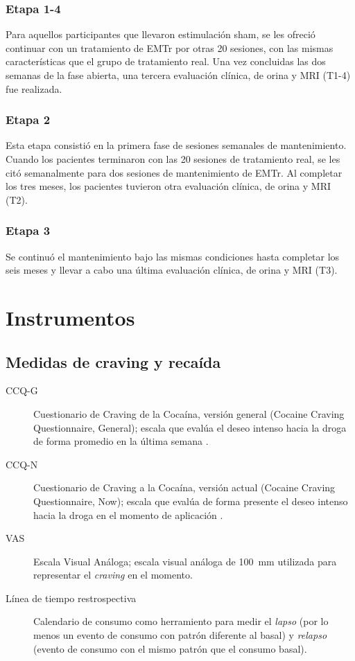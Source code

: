 \subsubsection{Etapa 1-4}
Para aquellos participantes que llevaron estimulación sham, se les ofreció continuar con un tratamiento de EMTr por otras 20 sesiones, con las mismas características que el grupo de tratamiento real. Una vez concluidas las dos semanas de la fase abierta, una tercera evaluación clínica, de orina y MRI (T1-4) fue realizada.

\subsubsection{Etapa 2}
Esta etapa consistió en la primera fase de sesiones semanales de mantenimiento. Cuando los pacientes terminaron con las 20 sesiones de tratamiento real, se les citó semanalmente para dos sesiones de mantenimiento de EMTr. Al completar los tres meses, los pacientes tuvieron otra evaluación clínica, de orina y MRI (T2).

\subsubsection{Etapa 3}
Se continuó el mantenimiento bajo las mismas condiciones hasta completar los seis meses y llevar a cabo una última evaluación clínica, de orina y MRI (T3).

\section{Instrumentos}
\subsection{Medidas de craving y recaída}
\begin{description}
    \item[CCQ-G] Cuestionario de Craving de la Cocaína, versión general (Cocaine Craving Questionnaire, General); escala que evalúa el deseo intenso hacia la droga de forma promedio en la última semana \parencite{Tiffany1993}.
    \item[CCQ-N] Cuestionario de Craving a la Cocaína, versión actual (Cocaine Craving Questionnaire, Now); escala que evalúa de forma presente el deseo intenso hacia la droga en el momento de aplicación \parencite{Tiffany1993}.
    \item[VAS] Escala Visual Análoga; escala visual análoga de \SI{100}{\milli\meter} utilizada para representar el \textit{craving} en el momento.
    \item[Línea de tiempo restrospectiva] Calendario de consumo como herramiento para medir el \emph{lapso} (por lo menos un evento de consumo con patrón diferente al basal) y \emph{relapso} (evento de consumo con el mismo patrón que el consumo basal).
\end{description}
